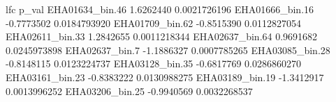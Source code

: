 \documentclass[
]{book}
\newenvironment{Shaded}{\begin{snugshade}}{\end{snugshade}}
\newcommand{\AttributeTok}[1]{\textcolor[rgb]{0.13,0.29,0.53}{#1}}
\newcommand{\CommentTok}[1]{\textcolor[rgb]{0.56,0.35,0.01}{\textit{#1}}}
\newcommand{\ConstantTok}[1]{\textcolor[rgb]{0.56,0.35,0.01}{#1}}
\newcommand{\DecValTok}[1]{\textcolor[rgb]{0.00,0.00,0.81}{#1}}
\newcommand{\FloatTok}[1]{\textcolor[rgb]{0.00,0.00,0.81}{#1}}
\newcommand{\FunctionTok}[1]{\textcolor[rgb]{0.13,0.29,0.53}{\textbf{#1}}}
\newcommand{\NormalTok}[1]{#1}
\newcommand{\OtherTok}[1]{\textcolor[rgb]{0.56,0.35,0.01}{#1}}
\newcommand{\SpecialCharTok}[1]{\textcolor[rgb]{0.81,0.36,0.00}{\textbf{#1}}}
\newcommand{\StringTok}[1]{\textcolor[rgb]{0.31,0.60,0.02}{#1}}
\begin{document}
\begin{Shaded}
\end{Shaded}

\begin{Shaded}
\begin{Highlighting}[]
\NormalTok{                       lfc        p\_val}
\NormalTok{EHA01634\_bin.46  1.6262440 0.0021726196}
\NormalTok{EHA01666\_bin.16 {-}0.7773502 0.0184793920}
\NormalTok{EHA01709\_bin.62 {-}0.8515390 0.0112827054}
\NormalTok{EHA02611\_bin.33  1.2842655 0.0011218344}
\NormalTok{EHA02637\_bin.64  0.9691682 0.0245973898}
\NormalTok{EHA02637\_bin.7  {-}1.1886327 0.0007785265}
\NormalTok{EHA03085\_bin.28 {-}0.8148115 0.0123224737}
\NormalTok{EHA03128\_bin.35 {-}0.6817769 0.0286860270}
\NormalTok{EHA03161\_bin.23 {-}0.8383222 0.0130988275}
\NormalTok{EHA03189\_bin.19 {-}1.3412917 0.0013996252}
\NormalTok{EHA03206\_bin.25 {-}0.9940569 0.0032268537}
\end{Highlighting}
\end{Shaded}
\end{document}
